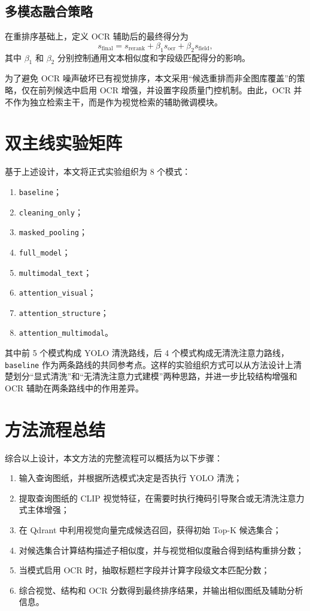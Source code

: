 \subsection{多模态融合策略}

在重排序基础上，定义 OCR 辅助后的最终得分为
\begin{equation}
  s_{\text{final}} = s_{\text{rerank}} + \beta_1 s_{\text{ocr}} + \beta_2 s_{\text{field}},
  \label{eq:final-score-new}
\end{equation}
其中 $\beta_1$ 和 $\beta_2$ 分别控制通用文本相似度和字段级匹配得分的影响。

为了避免 OCR 噪声破坏已有视觉排序，本文采用“候选重排而非全图库覆盖”的策略，仅在前列候选中启用 OCR 增强，并设置字段质量门控机制。由此，OCR 并不作为独立检索主干，而是作为视觉检索的辅助微调模块。

\section{双主线实验矩阵}

基于上述设计，本文将正式实验组织为 8 个模式：
\begin{enumerate}
  \item \texttt{baseline}；
  \item \texttt{cleaning\_only}；
  \item \texttt{masked\_pooling}；
  \item \texttt{full\_model}；
  \item \texttt{multimodal\_text}；
  \item \texttt{attention\_visual}；
  \item \texttt{attention\_structure}；
  \item \texttt{attention\_multimodal}。
\end{enumerate}

其中前 5 个模式构成 YOLO 清洗路线，后 4 个模式构成无清洗注意力路线，\texttt{baseline} 作为两条路线的共同参考点。这样的实验组织方式可以从方法设计上清楚划分“显式清洗”和“无清洗注意力式建模”两种思路，并进一步比较结构增强和 OCR 辅助在两条路线中的作用差异。

\section{方法流程总结}

综合以上设计，本文方法的完整流程可以概括为以下步骤：
\begin{enumerate}
  \item 输入查询图纸，并根据所选模式决定是否执行 YOLO 清洗；
  \item 提取查询图纸的 CLIP 视觉特征，在需要时执行掩码引导聚合或无清洗注意力式主体增强；
  \item 在 Qdrant 中利用视觉向量完成候选召回，获得初始 Top-K 候选集合；
  \item 对候选集合计算结构描述子相似度，并与视觉相似度融合得到结构重排分数；
  \item 当模式启用 OCR 时，抽取标题栏字段并计算字段级文本匹配分数；
  \item 综合视觉、结构和 OCR 分数得到最终排序结果，并输出相似图纸及辅助分析信息。
\end{enumerate}

